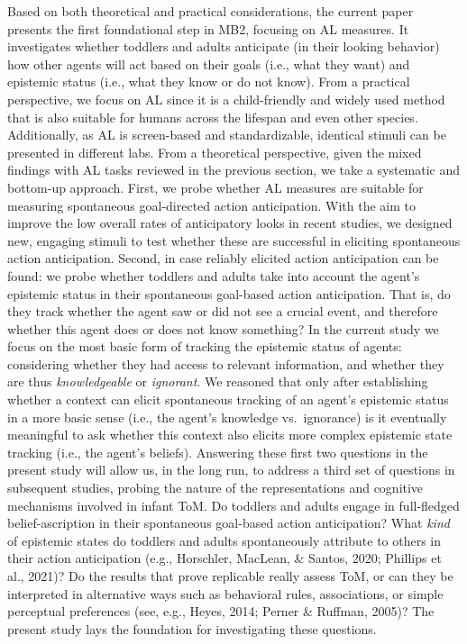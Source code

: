 \documentclass[
  english,
  man,floatsintext]{apa6}
\begin{document}
Based on both theoretical and practical considerations, the current paper presents the first foundational step in MB2, focusing on AL measures. It investigates whether toddlers and adults anticipate (in their looking behavior) how other agents will act based on their goals (i.e., what they want) and epistemic status (i.e., what they know or do not know). From a practical perspective, we focus on AL since it is a child-friendly and widely used method that is also suitable for humans across the lifespan and even other species. Additionally, as AL is screen-based and standardizable, identical stimuli can be presented in different labs. From a theoretical perspective, given the mixed findings with AL tasks reviewed in the previous section, we take a systematic and bottom-up approach.
First, we probe whether AL measures are suitable for measuring spontaneous goal-directed action anticipation. With the aim to improve the low overall rates of anticipatory looks in recent studies, we designed new, engaging stimuli to test whether these are successful in eliciting spontaneous action anticipation. Second, in case reliably elicited action anticipation can be found: we probe whether toddlers and adults take into account the agent's epistemic status in their spontaneous goal-based action anticipation. That is, do they track whether the agent saw or did not see a crucial event, and therefore whether this agent does or does not know something? In the current study we focus on the most basic form of tracking the epistemic status of agents: considering whether they had access to relevant information, and whether they are thus \emph{knowledgeable} or \emph{ignorant}. We reasoned that only after establishing whether a context can elicit spontaneous tracking of an agent's epistemic status in a more basic sense (i.e., the agent's knowledge vs.~ignorance) is it eventually meaningful to ask whether this context also elicits more complex epistemic state tracking (i.e., the agent's beliefs).
Answering these first two questions in the present study will allow us, in the long run, to address a third set of questions in subsequent studies, probing the nature of the representations and cognitive mechanisms involved in infant ToM. Do toddlers and adults engage in full-fledged belief-ascription in their spontaneous goal-based action anticipation? What \emph{kind} of epistemic states do toddlers and adults spontaneously attribute to others in their action anticipation (e.g., Horschler, MacLean, \& Santos, 2020; Phillips et al., 2021)? Do the results that prove replicable really assess ToM, or can they be interpreted in alternative ways such as behavioral rules, associations, or simple perceptual preferences (see, e.g., Heyes, 2014; Perner \& Ruffman, 2005)? The present study lays the foundation for investigating these questions.
\end{document}
